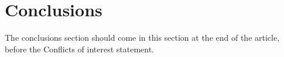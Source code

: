 \documentclass[twoside,twocolumn,9pt]{article}
\begin{document}







\section{Conclusions}
The conclusions section should come in this section at the end of the article, before the Conflicts of interest statement.
\end{document}
